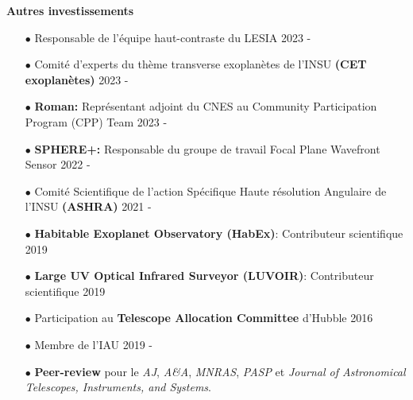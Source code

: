 \documentclass[11pt, a4paper, french]{article}
\begin{document}
\textbf{Autres investissements}\\
\vspace{-0.1cm}
\begin{itemize} \itemsep 5pt
    \item[$\bullet$] \small Responsable de l'équipe haut-contraste du LESIA \hfill 2023 - 
    \item[$\bullet$] \small Comité d'experts du thème transverse exoplanètes de l'INSU \textbf{(CET exoplanètes)} \hfill 2023 - 
    \item[$\bullet$] \small \textbf{Roman:} Représentant adjoint du CNES au Community Participation Program (CPP) Team \hfill 2023 - 
    \item[$\bullet$] \small \textbf{SPHERE+:} Responsable du groupe de travail Focal Plane Wavefront Sensor \hfill 2022 - 
    \item[$\bullet$] \small Comité Scientifique de l'action Spécifique Haute résolution Angulaire de l'INSU \textbf{(ASHRA)} \hfill 2021 - 
    \item[$\bullet$] \small \textbf{Habitable Exoplanet Observatory (HabEx)}: Contributeur scientifique \hfill 2019
    \item[$\bullet$] \small \textbf{Large UV Optical Infrared Surveyor (LUVOIR)}: Contributeur scientifique \hfill 2019
    \item[$\bullet$] \small Participation au {\bf Telescope Allocation Committee} d'Hubble \hfill 2016
    \item[$\bullet$] \small Membre de l'IAU \hfill 2019 - 
    \item[$\bullet$] \small \textbf{Peer-review} pour le \textit{AJ}, \textit{A\&A}, \textit{MNRAS}, \textit{PASP} et \textit{Journal of Astronomical Telescopes, Instruments, and Systems}.
\end{itemize}
\end{document}
